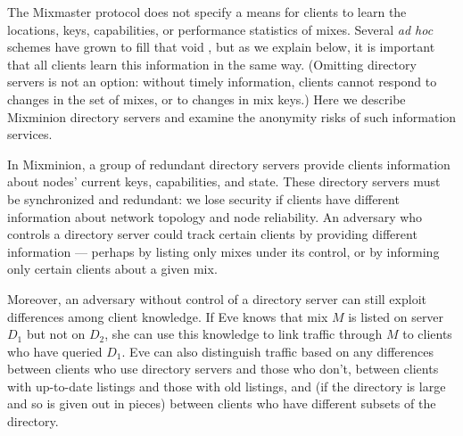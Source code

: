 \documentclass[times,10pt,twocolumn]{article}
\begin{document}

\label{sec:dir-servers}

The Mixmaster protocol does not specify a means for clients to learn the
locations, keys, capabilities, or performance statistics of mixes. Several
\emph{ad hoc} schemes have grown to fill that void \cite{echolot}, but as we
explain below, it is important that all clients learn this information in
the same way.  (Omitting directory servers is not an option: without timely
information, clients cannot respond to changes in the set of mixes, or to
changes in mix keys.)
Here
we describe Mixminion directory servers and examine the anonymity risks
of such information services.

In Mixminion, a group of redundant directory servers provide clients
information about nodes' current keys, capabilities, and state.
These directory servers must be synchronized and redundant: we lose security if
clients have different information about network topology and node
reliability. An adversary who controls a directory server could track
certain clients by providing different information --- perhaps by listing
only mixes under its control, or by informing only certain clients about a
given mix.

Moreover, an adversary without control of a directory server can still exploit
differences among client knowledge. If Eve knows that mix $M$ is listed
on server $D_1$ but not on $D_2$, she can use this knowledge to link
traffic through $M$ to clients who have queried $D_1$.  Eve can also
distinguish traffic based on any differences between clients who use
directory servers and those who don't, between clients with up-to-date
listings and those with old listings, and (if the directory is large
and so is given out in pieces) between clients who have different subsets
of the directory.
\end{document}
